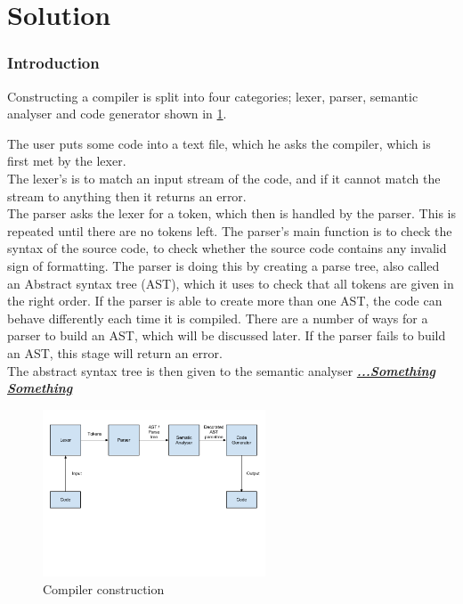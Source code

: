 \part{Solution}
\section*{Introduction}
Constructing a compiler is split into four categories; lexer, parser, semantic analyser and code generator shown in \ref{fig:Compilerconstruction}.

The user puts some code into a text file, which he asks the compiler, which is first met by the lexer. \\
The lexer's is to match an input stream of the code, and if it cannot match the stream to anything then it returns an error. \\

The parser asks the lexer for a token, which then is handled by the parser. This is repeated until there are no tokens left. The parser's main function is to check the syntax of the source code, to check whether the source code contains any invalid sign of formatting. The parser is doing this by creating a parse tree, also called an Abstract syntax tree (AST), which it uses to check that all tokens are given in the right order. If the parser is able to create more than one AST, the code can behave differently each time it is compiled. There are a number of ways for a parser to build an AST, which will be discussed later. If the parser fails to build an AST, this stage will return an error.\\

The abstract syntax tree is then given to the semantic analyser \textbf{\textit{\underline{...Something Something}}}



\begin{figure}[! h]
\centering
	 \includegraphics[width=250px]{images/Compilerconstruction.png}
		 \caption{Compiler construction}
	\label{fig:Compilerconstruction}
\end{figure}
